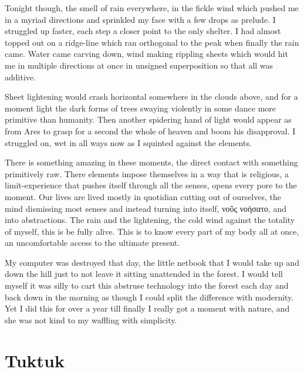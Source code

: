 \documentclass[ebook, 10pt, openright, onecolumn]{memoir}
\newcommand{\textgreek}[1]{\begingroup\fontencoding{LGR}\selectfont#1\endgroup}
\newlength{\drop}
\begin{document}
Tonight though, the smell of rain everywhere, in the fickle wind which pushed me
in a myriad directions and sprinkled my face with a few drops as prelude.  I
struggled up faster, each step a closer point to the only shelter.  I had almost
topped out on a ridge-line which ran orthogonal to the peak when finally the
rain came.  Water came carving down,  wind making rippling
sheets which would hit me in multiple directions at once in unsigned
superposition so that all was additive.

Sheet lightening would crash horizontal somewhere in the clouds above, and for a
moment light the dark forms of trees swaying violently in some dance more
primitive than humanity.  Then another spidering hand of light would appear as
from Ares to grasp for a second the whole of heaven and boom his disapproval.  I
struggled on, wet in all ways now as I squinted against the elements. 

There is something amazing in these moments, the direct contact with something
primitively raw.  There elements impose themselves in a way that is religious, a
limit-experience that pushes itself through all the senses, opens every pore to
the moment.  Our lives are lived mostly in quotidian cutting out of ourselves,
the mind dismissing most senses and instead turning into itself, \textgreek{νοῦς
  νοήσατο},  and into abstractions.  The rain and the lightening, the cold
wind against the totality of myself, this is be fully alive.  This is to know
every part of my body all at once, an uncomfortable access to the ultimate
present.

My computer was destroyed that day, the little netbook that I would take up and
down the hill just to not leave it sitting unattended in the forest.  I would
tell myself it was silly to cart this abstruse technology into the forest each
day and back down in the morning as though I could split the difference with
modernity.  Yet I did this for over a year till finally I really got a moment
with nature, and she was not kind to my waffling with simplicity.  

\chapter{Tuktuk}
\label{cha:tuktuk}
\end{document}
